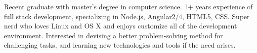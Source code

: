 

\begin{cvparagraph}

Recent graduate with master's degree in computer science. 1+ years experience of full stack development, specializing in Node.js, Angular2/4, HTML5, CSS. Super nerd who loves Linux and OS X and enjoys customize all of the development environment. Interested in devising a better problem-solving method for challenging tasks, and learning new technologies and tools if the need arises.
\end{cvparagraph}
